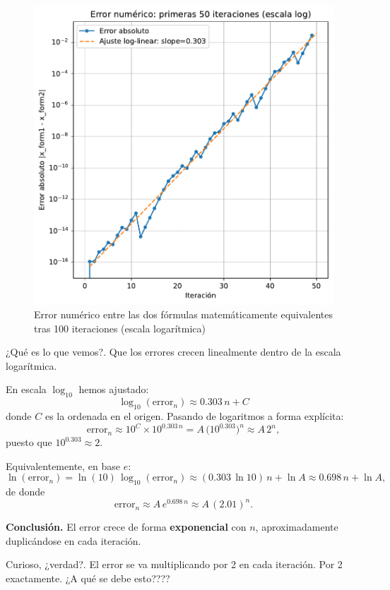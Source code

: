 \documentclass[
  10pt,
  a4paper,
  DIV=11,
  numbers=noendperiod,
  open=any]{scrreprt}
\numberwithin{equation}{chapter}
\numberwithin{equation}{section}
\renewcommand{\[}{\begin{equation}}
\renewcommand{\]}{\end{equation}}
\begin{document}
\begin{figure}[h]
  \centering
  \includegraphics[keepaspectratio]{01-logistica/lyapunov_files/figure-pdf/cell-9-output-1.pdf}
  \caption{Error numérico entre las dos fórmulas matemáticamente equivalentes tras 100 iteraciones (escala logarítmica)}
\end{figure}  


¿Qué es lo que vemos?. Que los errores crecen linealmente dentro de la
escala logarítmica.

En escala \(\log_{10}\) hemos ajustado: \[
\log_{10}(\mathrm{error}_n)\approx 0.303\,n + C
\] donde \(C\) es la ordenada en el origen. Pasando de logaritmos a
forma explícita: \[
\mathrm{error}_n \approx 10^C \times 10^{0.303\,n}
= A\,\bigl(10^{0.303}\bigr)^n
\approx A\,2^n,
\] puesto que \(10^{0.303}\approx2\).

Equivalentemente, en base \(e\): \[
\ln(\mathrm{error}_n)
= \ln(10)\,\log_{10}(\mathrm{error}_n)
\approx (0.303\,\ln 10)\,n + \ln A
\approx 0.698\,n + \ln A,
\] de donde \[
\mathrm{error}_n \approx A\,e^{0.698\,n}\approx A\,(2.01)^n.
\]

\textbf{Conclusión.} El error crece de forma \textbf{exponencial} con
\(n\), aproximadamente duplicándose en cada iteración.

Curioso, ¿verdad?. El error se va multiplicando por 2 en cada iteración.
Por 2 exactamente. ¿A qué se debe esto????
\end{document}
